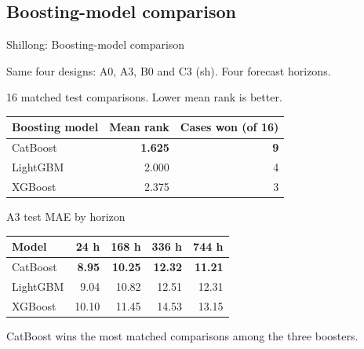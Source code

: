 \subsection{Boosting-model comparison}
\begin{frame}{Shillong: Boosting-model comparison}
  {\small Same four designs: A0, A3, B0 and C3 (sh). Four forecast horizons.\par
  16 matched test comparisons. Lower mean rank is better.}\par\medskip
  \centering
  \begin{tabular}{lrr}
    \toprule
    Boosting model & Mean rank & Cases won (of 16) \\
    \midrule
    CatBoost & \textbf{1.625} & \textbf{9} \\
    LightGBM & 2.000 & 4 \\
    XGBoost & 2.375 & 3 \\
    \bottomrule
  \end{tabular}
  \par\medskip
  {\small A3 test MAE by horizon}\par\smallskip
  \scriptsize
  \begin{tabular}{lrrrr}
    \toprule
    Model & 24 h & 168 h & 336 h & 744 h \\
    \midrule
    CatBoost & \textbf{8.95} & \textbf{10.25} & \textbf{12.32} & \textbf{11.21} \\
    LightGBM & 9.04 & 10.82 & 12.51 & 12.31 \\
    XGBoost & 10.10 & 11.45 & 14.53 & 13.15 \\
    \bottomrule
  \end{tabular}
  \par\medskip
  CatBoost wins the most matched comparisons among the three boosters.
\end{frame}
